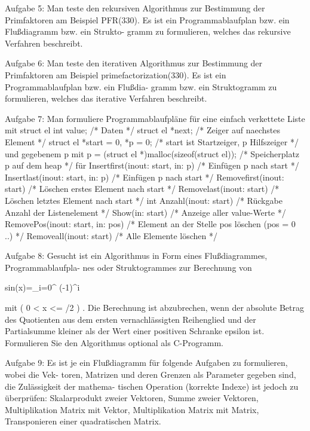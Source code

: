 Aufgabe 5: Man teste den rekursiven Algorithmus zur Bestimmung der Primfaktoren am
Beispiel PFR(330). Es ist ein Programmablaufplan bzw. ein Flußdiagramm bzw. ein Strukto-
gramm zu formulieren, welches das rekursive Verfahren beschreibt.

Aufgabe 6: Man teste den iterativen Algorithmus zur Bestimmung der Primfaktoren am
Beispiel primefactorization(330). Es ist ein Programmablaufplan bzw. ein Flußdia-
gramm bzw. ein Struktogramm zu formulieren, welches das iterative Verfahren beschreibt.

Aufgabe 7: Man formuliere Programmablaufpläne für eine einfach verkettete Liste mit
struct el { int value; /* Daten */
struct el *next; /* Zeiger auf naechstes Element */
}
struct el *start = 0, *p = 0; /* start ist Startzeiger, p Hilfszeiger */ und gegebenem p mit
p = (struct el *)malloc(sizeof(struct el)); /* Speicherplatz p auf dem heap */
für
Insertfirst(inout: start, in: p)
/* Einfügen p nach start */
Insertlast(inout: start, in: p)
/* Einfügen p nach start */
Removefirst(inout: start)
/* Löschen erstes Element nach start */
Removelast(inout: start)
/* Löschen letztes Element nach start */
int Anzahl(inout: start)
/* Rückgabe Anzahl der Listenelement */
Show(in: start)
/* Anzeige aller value-Werte */
RemovePos(inout: start, in: pos) /* Element an der Stelle pos löschen (pos = 0 ..) */
Removeall(inout: start)
/* Alle Elemente löschen */

Aufgabe 8: Gesucht ist ein Algorithmus in Form eines Flußdiagrammes, Programmablaufpla-
nes oder Struktogrammes zur Berechnung von

sin(x)=\Sigma_{i=0}^{\infty} (-1)^i \cdot {}

mit ( 0 < x <= \pi/2 ) . Die Berechnung ist abzubrechen, wenn der absolute Betrag des Quotienten
aus dem ersten vernachlässigten Reihenglied und der Partialsumme kleiner als der Wert einer
positiven Schranke epsilon ist. Formulieren Sie den Algorithmus optional als C-Programm.

Aufgabe 9: Es ist je ein Flußdiagramm für folgende Aufgaben zu formulieren, wobei die Vek-
toren, Matrizen und deren Grenzen als Parameter gegeben sind, die Zulässigkeit der mathema-
tischen Operation (korrekte Indexe) ist jedoch zu überprüfen:
Skalarprodukt zweier Vektoren, Summe zweier Vektoren, Multiplikation Matrix mit Vektor,
Multiplikation Matrix mit Matrix, Transponieren einer quadratischen Matrix.
